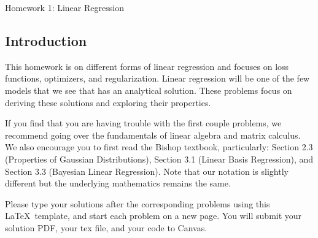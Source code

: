 \documentclass[submit]{harvardml}
\begin{document}
\begin{center}
{\Large Homework 1: Linear Regression}\\
\end{center}



\subsection*{Introduction}
This homework is on different forms of linear regression and focuses
on loss functions, optimizers, and regularization. Linear regression 
will be one of the few models that we see that has an analytical solution.
These problems focus on deriving these solutions and exploring their 
properties. 

If you find that you are having trouble with the first couple
problems, we recommend going over the fundamentals of linear algebra
and matrix calculus. We also encourage you to first read the Bishop
textbook, particularly: Section 2.3 (Properties of Gaussian
Distributions), Section 3.1 (Linear Basis Regression), and Section 3.3
(Bayesian Linear Regression). Note that our notation is slightly different but
the underlying mathematics remains the same.

Please type your solutions after the corresponding problems using this
\LaTeX\ template, and start each problem on a new page. You will
submit your solution PDF, your tex file, and your code to Canvas.\\

\pagebreak 
\end{document}
